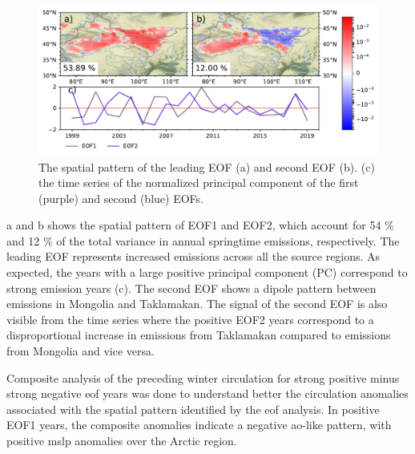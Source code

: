 \begin{figure}[htbp]
    \centering
    \includegraphics[width=\textwidth]{texfiles/figs/Emissions_EOF.pdf}
    \caption{The spatial pattern of the leading EOF (a) and second EOF (b). (c) the time series of the normalized principal component of the first (purple) and second (blue) EOFs.}
    \label{fig:emissions_eof}
\end{figure}
a and b shows the spatial pattern of EOF1 and EOF2, which account for 54 \% and 12 \% of the total variance in annual springtime emissions, respectively. 
The leading EOF represents increased emissions across all the source regions. 
As expected, the years with a large positive principal component (PC) correspond to strong emission years (c). 
The second EOF shows a dipole pattern between emissions in Mongolia and Taklamakan. 
The signal of the second EOF is also visible from the time series where the positive EOF2 years correspond to a disproportional increase in emissions from Taklamakan compared to emissions from Mongolia and vice versa.       

Composite analysis of the preceding winter circulation for strong positive minus strong negative \acrshort{eof} years was done to understand better the circulation anomalies associated with the spatial pattern identified by the \acrshort{eof} analysis. 
In positive EOF1 years, the composite anomalies indicate a negative \acrshort{ao}-like pattern, with positive \acrshort{mslp} anomalies over the Arctic region. 

